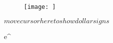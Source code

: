 



\begin{figure}[htpb]
    \centering
    \texttt{[image: ]}
    \caption{}
    \label{fig:}
\end{figure}

\frac{}{}  %

$move cursor here to show dollar signs$


e^{}  %

